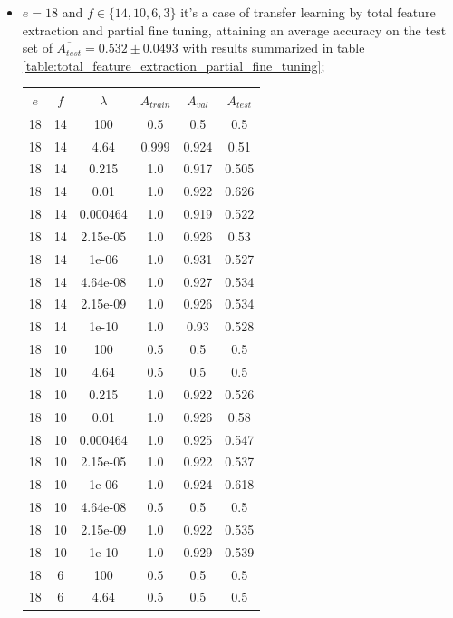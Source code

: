 \begin{itemize}
    \item $e = 18$ and $f \in \{14,10,6,3\}$ it's a case of transfer learning by total feature extraction and partial fine tuning, attaining an average accuracy on the test set of $\overline{A_{test}} = 0.532 \pm 0.0493$ with results summarized in table \ref{table:total_feature_extraction_partial_fine_tuning};

        \begin{table}[ht]
        \centering
        \begin{tabular}{ |c|c|c|c|c|c| }
        \hline
        $e$ & $f$ & $\lambda$ & $A_{train}$ & $A_{val}$ & $A_{test}$ \\
        \hline
        18 & 14 & 100 & 0.5 & 0.5 & 0.5 \\
        18 & 14 & 4.64 & 0.999 & 0.924 & 0.51 \\
        18 & 14 & 0.215 & 1.0 & 0.917 & 0.505 \\
        18 & 14 & 0.01 & 1.0 & 0.922 & 0.626 \\
        18 & 14 & 0.000464 & 1.0 & 0.919 & 0.522 \\
        18 & 14 & 2.15e-05 & 1.0 & 0.926 & 0.53 \\
        18 & 14 & 1e-06 & 1.0 & 0.931 & 0.527 \\
        18 & 14 & 4.64e-08 & 1.0 & 0.927 & 0.534 \\
        18 & 14 & 2.15e-09 & 1.0 & 0.926 & 0.534 \\
        18 & 14 & 1e-10 & 1.0 & 0.93 & 0.528 \\
        18 & 10 & 100 & 0.5 & 0.5 & 0.5 \\
        18 & 10 & 4.64 & 0.5 & 0.5 & 0.5 \\
        18 & 10 & 0.215 & 1.0 & 0.922 & 0.526 \\
        18 & 10 & 0.01 & 1.0 & 0.926 & 0.58 \\
        18 & 10 & 0.000464 & 1.0 & 0.925 & 0.547 \\
        18 & 10 & 2.15e-05 & 1.0 & 0.922 & 0.537 \\
        18 & 10 & 1e-06 & 1.0 & 0.924 & 0.618 \\
        18 & 10 & 4.64e-08 & 0.5 & 0.5 & 0.5 \\
        18 & 10 & 2.15e-09 & 1.0 & 0.922 & 0.535 \\
        18 & 10 & 1e-10 & 1.0 & 0.929 & 0.539 \\
        18 & 6 & 100 & 0.5 & 0.5 & 0.5 \\
        18 & 6 & 4.64 & 0.5 & 0.5 & 0.5 \\

\end{tabular}
\end{table}
\end{itemize}
